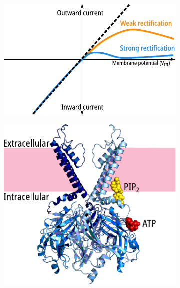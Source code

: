 \begin{figure}[h]
	\centering
	\begin{subfigure}[t]{0.5\textwidth}
		\caption{}\label{ch1fig:rectification}
		\centering
		\includegraphics[width=\textwidth]{rectification.pdf}
	\end{subfigure}
	\hfill
	\begin{subfigure}[t]{0.4\textwidth}
		\caption{}\label{ch1fig:kir_struct}
		\centering
		\includegraphics[width=\textwidth]{kir_structure.pdf}
	\end{subfigure}
	\vfill
	\begin{subfigure}[t]{0.9\textwidth}
		\caption{}\label{ch1fig:shyng_trace}

\end{subfigure}
\end{figure}
